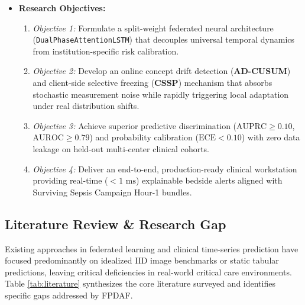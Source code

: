 \documentclass[11pt, a4paper]{article}
\begin{document}
\begin{itemize}[noitemsep, topsep=2pt]
    \item \textbf{Research Objectives:}
    \begin{enumerate}[noitemsep, topsep=2pt]
        \item \textit{Objective 1:} Formulate a split-weight federated neural architecture (\texttt{DualPhaseAttentionLSTM}) that decouples universal temporal dynamics from institution-specific risk calibration.
        \item \textit{Objective 2:} Develop an online concept drift detection (\textbf{AD-CUSUM}) and client-side selective freezing (\textbf{CSSP}) mechanism that absorbs stochastic measurement noise while rapidly triggering local adaptation under real distribution shifts.
        \item \textit{Objective 3:} Achieve superior predictive discrimination ($\text{AUPRC} \ge 0.10$, $\text{AUROC} \ge 0.79$) and probability calibration ($\text{ECE} < 0.10$) with zero data leakage on held-out multi-center clinical cohorts.
        \item \textit{Objective 4:} Deliver an end-to-end, production-ready clinical workstation providing real-time ($< 1\text{ ms}$) explainable bedside alerts aligned with Surviving Sepsis Campaign Hour-1 bundles.
    \end{enumerate}
\end{itemize}

\subsection{Literature Review \& Research Gap}
\noindent
Existing approaches in federated learning and clinical time-series prediction have focused predominantly on idealized IID image benchmarks or static tabular predictions, leaving critical deficiencies in real-world critical care environments. Table \ref{tab:literature} synthesizes the core literature surveyed and identifies specific gaps addressed by FPDAF.
\end{document}
